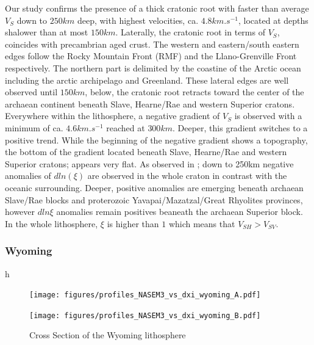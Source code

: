 \documentclass[12pt]{article}
\begin{document}

Our study confirms the presence of a thick cratonic root with faster than average $V_S$ down to $250km$ deep, with highest velocities, ca. $4.8km.s^{-1}$, located at depths shalower than at most $150km$. 
Laterally, the cratonic root in terms of $V_S$, coincides with precambrian aged crust. 
The western and eastern/south eastern edges follow the Rocky Mountain Front (RMF) and the Llano-Grenville Front respectively. 
The northern part is delimited by the coastine of the Arctic ocean including the arctic archipelago and Greenland. 
These lateral edges are well observed until $150km$, below, the cratonic root retracts toward the center of the archaean continent beneath Slave, Hearne/Rae and western Superior cratons. 
Everywhere within the lithosphere, a negative gradient of $V_S$ is observed with a minimum of ca. $4.6km.s^{-1}$ reached at $300km$. 
Deeper, this gradient switches to a positive trend. While the beginning of the negative gradient shows a topography, the bottom of the gradient located beneath Slave, Hearne/Rae and western Superior cratons; appears very flat.
As observed in \cite{gung2003global}; down to 250km negative anomalies of $dln(\xi)$ are observed in the whole craton in contrast with the oceanic surrounding. 
Deeper, positive anomalies are emerging beneath archaean Slave/Rae blocks and proterozoic Yavapai/Mazatzal/Great Rhyolites provinces, however $dln\xi$ anomalies remain positives beaneath the archaean Superior block. 
In the whole lithosphere, $\xi$ is higher than $1$ which means that $V_{SH} > V_{SV}$. 


\subsubsection{Wyoming}{h}
\begin{figure}
	\begin{minipage}{0.5\linewidth}
		\centerline{\texttt{[image: figures/profiles\_NASEM3\_vs\_dxi\_wyoming\_A.pdf]}}
	\end{minipage}
	\hfill
	\begin{minipage}{0.5\linewidth}
		\centerline{\texttt{[image: figures/profiles\_NASEM3\_vs\_dxi\_wyoming\_B.pdf]}}
	\end{minipage}

	\caption{Cross Section of the Wyoming lithosphere}
	\label{wyomingcross}

\end{figure}
\end{document}
